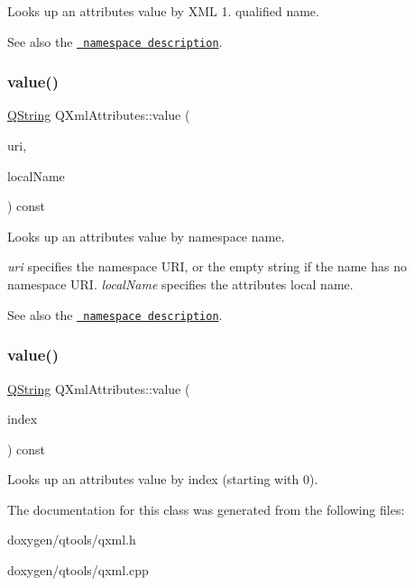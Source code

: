 Looks up an attribute\textquotesingle{}s value by X\+ML 1. qualified name.

See also the \href{xml-sax.html\#namespaces}{\texttt{ namespace description}}. \mbox{\label{class_q_xml_attributes_a89f8c3bd24121c177e1369ae5ea51f15}} 
\subsubsection{\texorpdfstring{value()}{value()}\hspace{0.1cm}{\footnotesize\ttfamily [2/3]}}
{\footnotesize\ttfamily \mbox{\hyperlink{class_q_string}{Q\+String}} Q\+Xml\+Attributes\+::value (\begin{DoxyParamCaption}\item[{const \mbox{\hyperlink{class_q_string}{Q\+String}} \&}]{uri,  }\item[{const \mbox{\hyperlink{class_q_string}{Q\+String}} \&}]{local\+Name }\end{DoxyParamCaption}) const}

Looks up an attribute\textquotesingle{}s value by namespace name.

{\itshape uri} specifies the namespace U\+RI, or the empty string if the name has no namespace U\+RI. {\itshape local\+Name} specifies the attribute\textquotesingle{}s local name.

See also the \href{xml-sax.html\#namespaces}{\texttt{ namespace description}}. \mbox{\label{class_q_xml_attributes_aa5bb29e5e301fef6e80c99a19f902c32}} 
\subsubsection{\texorpdfstring{value()}{value()}\hspace{0.1cm}{\footnotesize\ttfamily [3/3]}}
{\footnotesize\ttfamily \mbox{\hyperlink{class_q_string}{Q\+String}} Q\+Xml\+Attributes\+::value (\begin{DoxyParamCaption}\item[{int}]{index }\end{DoxyParamCaption}) const}

Looks up an attribute\textquotesingle{}s value by index (starting with 0). 

The documentation for this class was generated from the following files\+:\begin{DoxyCompactItemize}
\item 
doxygen/qtools/qxml.\+h\item 
doxygen/qtools/qxml.\+cpp\end{DoxyCompactItemize}
